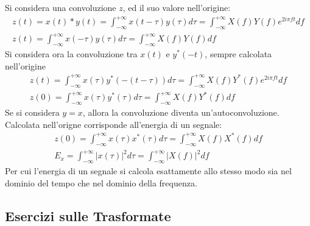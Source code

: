 \documentclass{article}
\numberwithin{equation}{subsection}
\begin{document}
Si considera una convoluzione $z$, ed il suo valore nell'origine:
\begin{gather*}
    z(t)=x(t)*y(t)=\displaystyle\int_{-\infty}^{+\infty}x(t-\tau)y(\tau)d\tau=\int_{-\infty}^{+\infty}X(f)Y(f)e^{2i\pi ft}df\\
    z(t)=\displaystyle\int_{-\infty}^{+\infty}x(-\tau)y(\tau)d\tau=\int_{-\infty}^{+\infty}X(f)Y(f)df
\end{gather*}
Si considera ora la convoluzione tra $x(t)$ e $y^*(-t)$, sempre calcolata nell'origine
\begin{gather*}
    z(t)=\displaystyle\int_{-\infty}^{+\infty}x(\tau)y^*(-(t-\tau))d\tau=\int_{-\infty}^{+\infty}X(f)Y^*(f)e^{2i\pi ft}df\\
    z(0)=\displaystyle\int_{-\infty}^{+\infty}x(\tau)y^*(\tau)d\tau=\int_{-\infty}^{+\infty}X(f)Y^*(f)df
\end{gather*}
Se si considera $y=x$, allora la convoluzione diventa un'autoconvoluzione. Calcolata nell'origne corrisponde all'energia di un segnale:
\begin{gather*}
    z(0)=\displaystyle\int_{-\infty}^{+\infty}x(\tau)x^*(\tau)d\tau=\int_{-\infty}^{+\infty}X(f)X^*(f)df\\
    E_x=\displaystyle\int_{-\infty}^{+\infty}|x(\tau)|^2d\tau=\int_{-\infty}^{+\infty}|X(f)|^2df
\end{gather*}
Per cui l'energia di un segnale si calcola esattamente allo stesso modo sia nel dominio del tempo che nel dominio della frequenza. 

\subsection{Esercizi sulle Trasformate}
\end{document}

